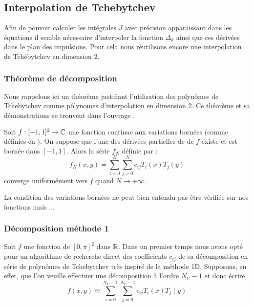 \documentclass[10pt]{article}
\begin{document}
\begin{multicols}{2}

\subsection{Interpolation de Tchebytchev}

Afin de pouvoir calculer les intégrales $J$ avec précision apparaissant dans les équations il semble nécessaire d'interpoler la fonction $\Delta_k$ ainsi que ces dérivées dans le plan des impulsions. Pour cela nous réutilisons encore une interpolation de Tchébytchev en dimension 2. 

\subsubsection{Théorème de décomposition}

Nous rappelons ici un théorème justifiant l'utilisation des polynômes de Tchebytchev comme pôlynomes d'interpolation en dimension 2. Ce théorème et sa démonstrations se trouvent dans l'ouvrage \cite{Tchebychev}. 

\begin{theorem}
  Soit $f : [-1,1]^2 \rightarrow \mathbb{C}$ une fonction continue aux variations bornées (comme définies en \cite{Tchebychev}). On suppose que l'une des dérivées partielles de de $f$ existe et est bornée dans $[-1,1]$. Alors la série $f_N$ définie par :
\begin{equation}
f_N(x,y) = \sum_{i=0} ^{N} \sum_{j=0} ^{N} c_{ij} T_i(x)T_j(y)
\end{equation}
converge uniformément vers $f$ quand $N \rightarrow +\infty$.
\end{theorem}

La condition des variations bornées ne peut bien entendu pas être vérifiée sur nos fonctions mais ...

\vspace*{11pt}

\subsubsection{Décomposition méthode 1}

Soit $f$ une fonction de $[0,\pi]^2$ dans $\mathbb{R}$. Dans un premier temps nous avons opté pour un algorithme de recherche direct des coefficients $c_{ij}$ de sa décomposition en série de polynômes de Tchebytchev très inspiré de la méthode 1D. Supposons, en effet, que l'on veuille effectuer une décomposition à l'ordre $N_C -1$ et donc écrire
\begin{equation}
  f(x,y) \simeq \sum_{i=0}^{N_C-1}\sum_{j=0}^{N_C-1} c_{ij} T_i(x)T_j(y)
\end{equation}


\end{multicols}
\end{document}
